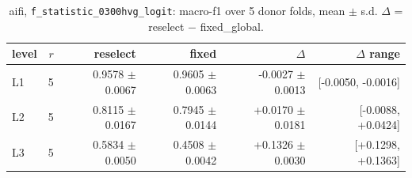 \begin{table}[t]
\centering
\small
\begin{tabular}{lrrrrr}
\toprule
level & $r$ & reselect & fixed & $\Delta$ & $\Delta$ range \\
\midrule
L1 & 5 & 0.9578 $\pm$ 0.0067 & 0.9605 $\pm$ 0.0063 & -0.0027 $\pm$ 0.0013 & [-0.0050, -0.0016] \\
L2 & 5 & 0.8115 $\pm$ 0.0167 & 0.7945 $\pm$ 0.0144 & +0.0170 $\pm$ 0.0181 & [-0.0088, +0.0424] \\
L3 & 5 & 0.5834 $\pm$ 0.0050 & 0.4508 $\pm$ 0.0042 & +0.1326 $\pm$ 0.0030 & [+0.1298, +0.1363] \\
\bottomrule
\end{tabular}
\caption{aifi, \texttt{f\_statistic\_0300hvg\_logit}: macro-f1 over 5 donor folds, mean $\pm$ s.d. $\Delta$ = reselect $-$ fixed\_global.}
\label{tab:cv-aifi-f-statistic-0300hvg-logit-macro_f1}
\end{table}